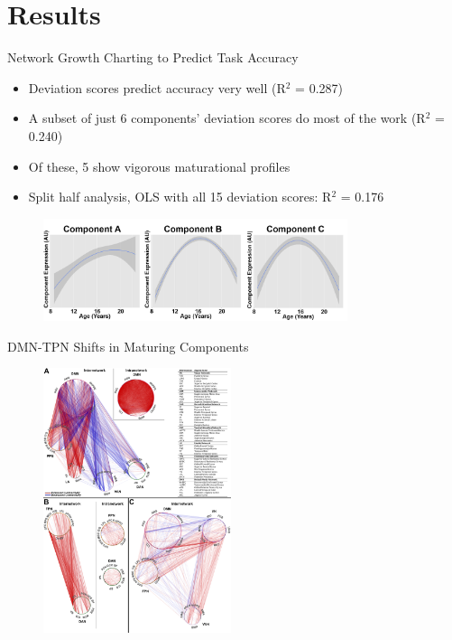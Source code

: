 \documentclass[presentation]{beamer}
\begin{document}
\section{Results}
\label{sec:orgheadline25}
\begin{frame}[label={sec:orgheadline20}]{Network Growth Charting to Predict Task Accuracy}
\begin{itemize}
\item \alert{Deviation scores} predict accuracy very well (R\(^{\text{2}}\) = 0.287)
\item A subset of just 6 components' \alert{deviation scores} do most of the work (R\(^{\text{2}}\) = 0.240)
\item Of these, 5 show vigorous maturational profiles
\item Split half analysis, OLS with all 15 \alert{deviation scores}: R\(^{\text{2}}\) = 0.176
\end{itemize}
\begin{figure}[htb]
\centering
\includegraphics[height=3cm]{./Figures/Figure3.png}
\end{figure}
\end{frame}
\begin{frame}[label={sec:orgheadline21}]{DMN-TPN Shifts in Maturing Components}
\begin{figure}[htb]
\centering
\includegraphics[height=7.75cm]{./Figures/Figure2.png}
\end{figure}
\end{frame}
\end{document}
